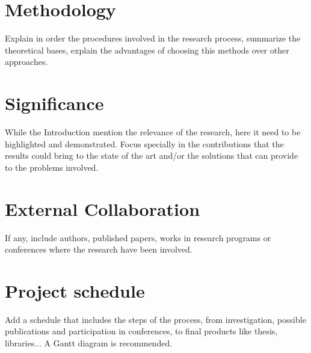 \documentclass[
  11pt,
  a4paper,
  oneside
]{article}
\begin{document}
\section{Methodology}
Explain in order the procedures involved in the research process, summarize the theoretical bases, explain the advantages of choosing this methods over other approaches.

\section{Significance}
While the Introduction mention the relevance of the research, here it need to be highlighted and demonstrated. Focus specially in the contributions that the results could bring to the state of the art and/or the solutions that can provide to the problems involved.

\section{External Collaboration}

If any, include authors, published papers, works in research programs or conferences where the research have been involved.

\section{Project schedule}
Add a schedule that includes the steps of the process, from investigation, possible publications and participation in conferences, to final products like thesis, libraries... A Gantt diagram is recommended.

\nocite{usc, uw, yu, ub, mu, proposal, yale}


\end{document}
